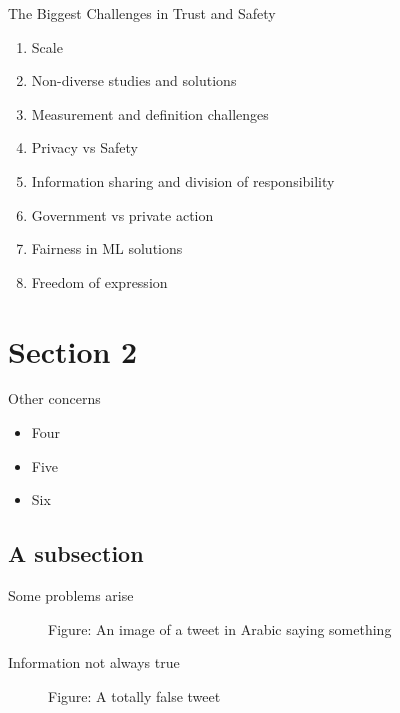 \documentclass[nobackground,dvipsnames,table]{beamer}
\begin{document}

\begin{frame}{The Biggest Challenges in Trust and Safety}
    \begin{enumerate}
        \item Scale
        \item Non-diverse studies and solutions
        \item Measurement and definition challenges
        \item Privacy vs Safety
        \item Information sharing and division of responsibility
        \item Government vs private action
        \item Fairness in ML solutions
        \item Freedom of expression
    \end{enumerate}
\end{frame}



\section{Section 2}

\begin{frame}{Other concerns}
    \begin{itemize}
        \item Four
        \item Five
        \item Six
    \end{itemize}
\end{frame}

\subsection{A subsection}

\begin{frame}{Some problems arise}
    \begin{figure}[ht]
        \center
        {Figure: An image of a tweet in Arabic saying something}
    \end{figure}
\end{frame}

\begin{frame}{Information not always true }
    \begin{figure}[ht]
        \center
        {Figure: A totally false tweet}
    \end{figure}
\end{frame}


\backpage
\end{document}
